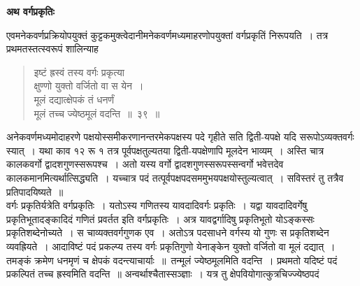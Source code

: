 \documentclass[11pt, openany]{book}
\begin{document}
\newpage
\thispagestyle{empty}
 {}
{}
{\fancyhead[RO,LE]{\textbf{\thepage}}}
\cfoot{}
 \label{varga}
\begin{center}
    \textbf{\LARGE अथ वर्गप्रकृतिः }
\end{center}
 
 \vspace{2mm}
 एवमनेकवर्णप्रक्रियोपयुक्तं कुट्टकमुक्त्वेदानीमनेकवर्णमध्यमाहरणोपयुक्तां वर्गप्रकृतिं निरूपयति~। तत्र प्रथमतस्तत्स्वरूपं शालिन्याह\textendash
 
 \label{39}
\begin{quote}
    \bs
     इष्टं ह्रस्वं तस्य वर्गः प्रकृत्या \\

\vspace{-7mm}
\hspace{1cm} क्षुण्णो युक्तो वर्जितो वा स येन~। \\

\vspace{-7mm}
 मूलं दद्यात्क्षेपकं तं धनर्णं \\

\vspace{-7mm}
\hspace{1cm} मूलं तच्च ज्येष्ठमूलं वदन्ति~॥~३९~॥~
\end{quote}

 अनेकवर्णमध्यमोदाहरणे पक्षयोस्समीकरणानन्तरमेकपक्षस्य पदे गृहीते सति 
द्विती-यपक्षे यदि सरूपोऽव्यक्तवर्गः स्यात्~। यथा काव १२ रू १ 
तत्र पूर्वपक्षतुल्यतया द्विती-यपक्षेणापि मूलदेन भाव्यम्~। अस्ति चात्र 
कालकवर्गो द्वादशगुणस्सरूपश्च~। अतो यस्य वर्गो द्वादशगुणस्सरूपस्सन्वर्गो भवेत्तदेव कालकमानमित्यर्थात्सिद्ध्यति~। यच्चात्र पदं
तत्पूर्वपक्षपदसममुभयपक्षयोस्तुल्यत्वात्~। सविस्तरं तु तत्रैव प्रतिपादयिष्यते~॥~\\

\vspace{-3mm}
 वर्गः प्रकृतिर्यत्रेति वर्गप्रकृतिः~। यतोऽस्य गणितस्य यावदादिवर्गः प्रकृतिः~। यद्वा यावदादिवर्गेषु प्रकृतिभूतादङ्कादिदं गणितं प्रवर्तत इति वर्गप्रकृतिः~। अत्र यावद्वर्गादिषु प्रकृतिभूतो योऽङ्कस्सः प्रकृतिशब्देनोच्यते~। स चाव्यक्तवर्गगुणक एव~। अतोऽत्र पदसाधने वर्गस्य यो गुणः स प्रकृतिशब्देन व्यवह्रियते~। आदाविष्टं पदं 
प्रकल्प्य तस्य वर्गः प्रकृतिगुणो येनाङ्केन युक्तो वर्जितो वा मूलं
दद्यात्~। तमङ्कं क्रमेण धनमृणं च क्षेपकं वदन्त्याचार्याः~॥~तन्मूलं ज्येष्ठमूलमिति वदन्ति~। प्रथमतो यदिष्टं पदं प्रकल्पितं तच्च ह्रस्वमिति वदन्ति~॥ अन्वर्थाश्चैतास्सञ्ज्ञाः~। यत्र तु क्षेपवियोगात्कुत्रचिज्ज्येष्ठपदं
\newpage
\end{document}
